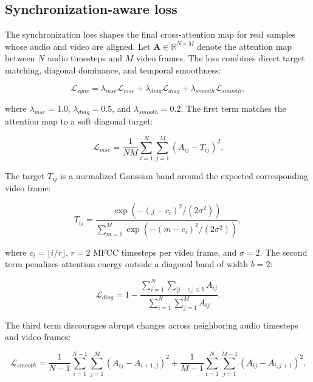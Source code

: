 \documentclass[preprint,12pt,number]{elsarticle}
\begin{document}
\subsection{Synchronization-aware loss}
\label{subsec:sync_loss}

The synchronization loss shapes the final cross-attention map for real samples whose audio and video are aligned. Let $\mathbf{A}\in\mathbb{R}^{N \times M}$ denote the attention map between $N$ audio timesteps and $M$ video frames. The loss combines direct target matching, diagonal dominance, and temporal smoothness:

\begin{equation}
\mathcal{L}_{sync} =
\lambda_{mse}\mathcal{L}_{mse}
+ \lambda_{diag}\mathcal{L}_{diag}
+ \lambda_{smooth}\mathcal{L}_{smooth},
\label{eq:sync_total}
\end{equation}

where $\lambda_{mse}=1.0$, $\lambda_{diag}=0.5$, and $\lambda_{smooth}=0.2$. The first term matches the attention map to a soft diagonal target:

\begin{equation}
\mathcal{L}_{mse}
= \frac{1}{NM}\sum_{i=1}^{N}\sum_{j=1}^{M}(A_{ij}-T_{ij})^2 .
\label{eq:mse}
\end{equation}

The target $T_{ij}$ is a normalized Gaussian band around the expected corresponding video frame:

\begin{equation}
T_{ij} =
\frac{\exp\left(-(j-c_i)^2/(2\sigma^2)\right)}
{\sum_{m=1}^{M}\exp\left(-(m-c_i)^2/(2\sigma^2)\right)} ,
\label{eq:target}
\end{equation}

where $c_i=\lfloor i/r \rfloor$, $r=2$ MFCC timesteps per video frame, and $\sigma=2$. The second term penalizes attention energy outside a diagonal band of width $b=2$:

\begin{equation}
\mathcal{L}_{diag}
= 1 -
\frac{\sum_{i=1}^{N}\sum_{|j-c_i|\leq b}A_{ij}}
{\sum_{i=1}^{N}\sum_{j=1}^{M}A_{ij}} .
\label{eq:diag}
\end{equation}

The third term discourages abrupt changes across neighboring audio timesteps and video frames:

\begin{equation}
\mathcal{L}_{smooth}
= \frac{1}{N-1}\sum_{i=1}^{N-1}\sum_{j=1}^{M}(A_{ij}-A_{i+1,j})^2
+ \frac{1}{M-1}\sum_{i=1}^{N}\sum_{j=1}^{M-1}(A_{ij}-A_{i,j+1})^2 .
\label{eq:smooth}
\end{equation}
\end{document}
